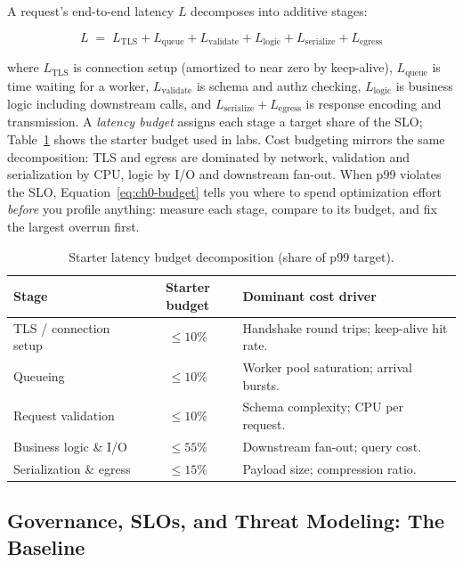 A request's end-to-end latency $L$ decomposes into additive stages:

\begin{equation}
  L \;=\; L_{\mathrm{TLS}} + L_{\mathrm{queue}} + L_{\mathrm{validate}}
        + L_{\mathrm{logic}} + L_{\mathrm{serialize}} + L_{\mathrm{egress}}
  \label{eq:ch0-budget}
\end{equation}

where $L_{\mathrm{TLS}}$ is connection setup (amortized to near zero by
keep-alive), $L_{\mathrm{queue}}$ is time waiting for a worker,
$L_{\mathrm{validate}}$ is schema and authz checking, $L_{\mathrm{logic}}$ is
business logic including downstream calls, and
$L_{\mathrm{serialize}} + L_{\mathrm{egress}}$ is response encoding and
transmission. A \emph{latency budget} assigns each stage a target share of
the SLO; Table~\ref{tab:ch0-budget} shows the starter budget used in labs.
Cost budgeting mirrors the same decomposition: TLS and egress are dominated
by network, validation and serialization by CPU, logic by I/O and downstream
fan-out. When p99 violates the SLO,
Equation~\eqref{eq:ch0-budget} tells you where to spend optimization effort
\emph{before} you profile anything: measure each stage, compare to its
budget, and fix the largest overrun first.

\begin{table}[h]
  \centering
  \small
  \begin{tabularx}{\textwidth}{l c X}
    \toprule
    \textbf{Stage} & \textbf{Starter budget} & \textbf{Dominant cost driver} \\
    \midrule
    TLS / connection setup & $\leq 10\%$ & Handshake round trips; keep-alive hit rate. \\
    Queueing & $\leq 10\%$ & Worker pool saturation; arrival bursts. \\
    Request validation & $\leq 10\%$ & Schema complexity; CPU per request. \\
    Business logic \& I/O & $\leq 55\%$ & Downstream fan-out; query cost. \\
    Serialization \& egress & $\leq 15\%$ & Payload size; compression ratio. \\
    \bottomrule
  \end{tabularx}
  \caption{Starter latency budget decomposition (share of p99 target).}
  \label{tab:ch0-budget}
\end{table}

\subsection{Governance, SLOs, and Threat Modeling: The Baseline}
\label{sec:ch0-governance}


